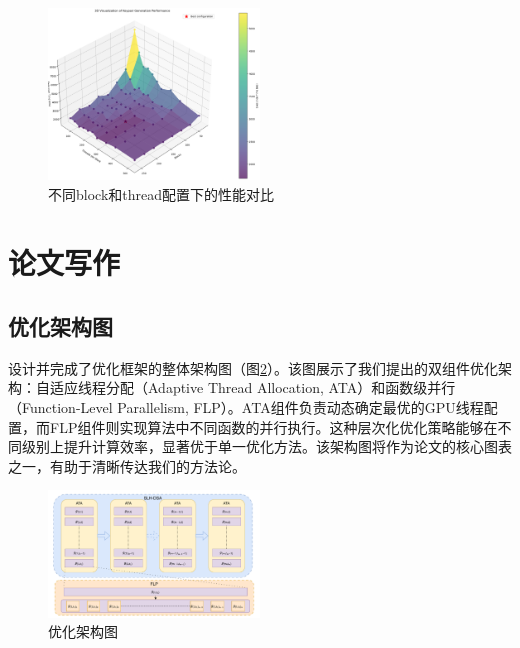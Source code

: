 \documentclass[report]{../../custom}
\begin{document}
\begin{figure}
  \centering
  \includegraphics[width=0.5\textwidth]{./fig/block_thread_time.png}
  \caption{不同block和thread配置下的性能对比}
  \label{fig:block_thread_time}
\end{figure}

\section{论文写作}

\subsection{优化架构图}

设计并完成了优化框架的整体架构图（图\ref{fig:optimization_architecture}）。该图展示了我们提出的双组件优化架构：自适应线程分配（Adaptive Thread Allocation, ATA）和函数级并行（Function-Level Parallelism, FLP）。ATA组件负责动态确定最优的GPU线程配置，而FLP组件则实现算法中不同函数的并行执行。这种层次化优化策略能够在不同级别上提升计算效率，显著优于单一优化方法。该架构图将作为论文的核心图表之一，有助于清晰传达我们的方法论。

\begin{figure}
  \centering
  \includegraphics[width=0.5\textwidth]{./fig/optimize-overview.pdf}
  \caption{优化架构图}
  \label{fig:optimization_architecture}
\end{figure}



\end{document}
